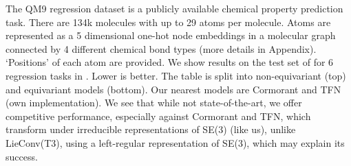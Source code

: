 \begin{table} %
\vspace{-8mm}
{\caption{QM9 Mean Absolute Error. Top: Non-equivariant models. Bottom: Equivariant models. SE(3)-Tr. is averaged over 5 runs.}
\label{tab:QM9}}
\end{table}


The QM9 regression dataset \citep{RamakrishnanDRvL14} is a publicly available chemical property prediction task. There are 134k molecules with up to 29 atoms per molecule. Atoms are represented as a 5 dimensional one-hot node embeddings in a molecular graph connected by 4 different chemical bond types  (more details in Appendix). `Positions' of each atom are provided. We show results on the test set of \citet{anderson2019cormorant} for 6 regression tasks in . Lower is better. The table is split into non-equivariant (top) and equivariant models (bottom). Our nearest models are Cormorant and TFN (own implementation). We see that while not state-of-the-art, we offer competitive performance, especially against Cormorant and TFN, which transform under irreducible representations of SE(3) (like us), unlike LieConv(T3), using a left-regular representation of SE(3), which may explain its success.

